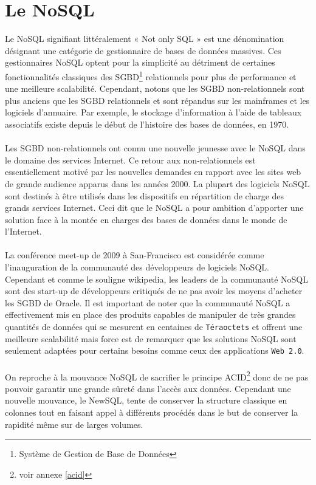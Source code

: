 \section{Le \textsf{NoSQL}}

Le NoSQL signifiant littéralement « \textsf{Not only SQL} » est une
dénomination désignant une catégorie de gestionnaire de bases de
données massives. Ces gestionnaires \textsf{NoSQL} optent pour la
simplicité au détriment de certaines fonctionnalités classiques des
\textsf{SGBD}\footnote{Système de Gestion de Base de Données}
relationnels pour plus de performance et une meilleure
scalabilité. Cependant, notons que les \textsf{SGBD} non-relationnels
sont plus anciens que les \textsf{SGBD} relationnels et sont répandus
sur les mainframes et les logiciels d'annuaire. Par exemple, le
stockage d'information à l'aide de tableaux associatifs existe depuis
le début de l'histoire des bases de données, en 1970.  \\ \\ Les
\textsf{SGBD} non-relationnels ont connu une nouvelle jeunesse avec le
\textsf{NoSQL} dans le domaine des services \textsf{Internet}. Ce
retour aux non-relationnels est essentiellement motivé par les
nouvelles demandes en rapport avec les sites web de grande audience
apparus dans les années 2000. La plupart des logiciels \textsf{NoSQL}
sont destinés à être utilisés dans les dispositifs en répartition de
charge des grands services \textsf{Internet}. Ceci dit que le
\textsf{NoSQL} a pour ambition d'apporter une solution face à la
montée en charges des bases de données dans le monde de
l'\textsf{Internet}.  \\ \\ La conférence meet-up de 2009 à \textsf{San-Francisco} est considérée comme
l'inauguration de la communauté des développeurs de logiciels
\textsf{NoSQL}. Cependant et comme le souligne \textsf{wikipedia}, les
leaders de la communauté \textsf{NoSQL} sont des \textsf{start-up} de
développeurs critiqués de ne pas avoir les moyens d'acheter les
\textsf{SGBD} de Oracle\cite{wikiNoSQL}. Il est important de noter que
la communauté \textsf{NoSQL} a effectivement mis en place des produits
capables de manipuler de très grandes quantités de données qui se
mesurent en centaines de \texttt{Téraoctets} et offrent une meilleure
scalabilité mais force est de remarquer que les solutions
\textsf{NoSQL} sont seulement adaptées pour certains besoins comme
ceux des applications \texttt{Web 2.0}.  \\\\ On reproche à la
mouvance \textsf{NoSQL} de sacrifier le principe
\textsf{ACID}\footnote{voir annexe \ref{acid}}  donc de ne
pas pouvoir garantir une grande sûreté dans l'accès aux
données. Cependant une nouvelle mouvance, le \textsf{NewSQL}, tente de
conserver la structure classique en colonnes tout en faisant appel à
différents procédés dans le but de conserver la rapidité même sur de
larges volumes\cite{newSQL}.

